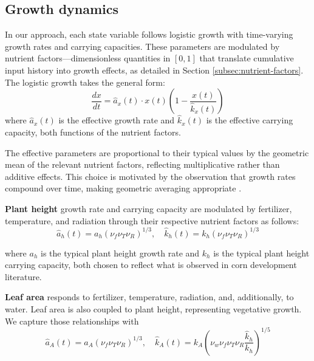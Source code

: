 \documentclass[preprint,12pt]{elsarticle}
\newcommand{\df}[2]{\displaystyle\frac{#1}{#2}}
\begin{document}
\subsection{Growth dynamics}\label{subsec:dynamics}

In our approach, each state variable follows logistic growth with time-varying growth rates and carrying capacities. These parameters are modulated by nutrient factors---dimensionless quantities in $[0,1]$ that translate cumulative input history into growth effects, as detailed in Section \ref{subsec:nutrient-factors}. The logistic growth takes the general form:
\begin{equation}
\df{dx}{dt} = \hat{a}_{x}(t) \cdot x(t) \left( 1 - \df{x(t)}{\hat{k}_{x}(t)} \right)
\label{eqn:logistic-general}
\end{equation}
where $\hat{a}_{x}(t)$ is the effective growth rate and $\hat{k}_{x}(t)$ is the effective carrying capacity, both functions of the nutrient factors.

The effective parameters are proportional to their typical values by the geometric mean of the relevant nutrient factors, reflecting multiplicative rather than additive effects. This choice is motivated by the observation that growth rates compound over time, making geometric averaging appropriate \cite{geometric-mean-growth}.

\textbf{Plant height} growth rate and carrying capacity are modulated by fertilizer, temperature, and radiation     
  through their respective nutrient factors as follows:
\begin{equation}
\hat{a}_{h}(t) = a_{h}(\nu_{f}\nu_{T}\nu_{R})^{1/3}, \quad \hat{k}_{h}(t) = k_{h}(\nu_{f}\nu_{T}\nu_{R})^{1/3}
\label{eqn:hats-for-h}
\end{equation}

\noindent where $a_{h}$ is the typical plant height growth rate and $k_{h}$ is the typical plant height carrying capacity, both chosen to reflect what is observed in corn development literature.

\textbf{Leaf area} responds to fertilizer, temperature, radiation, and, additionally, to water. Leaf area is also coupled to plant height, representing vegetative growth. We capture those relationships with
\begin{equation}
\hat{a}_{A}(t) = a_{A}(\nu_{f}\nu_{T}\nu_{R})^{1/3}, \quad \hat{k}_{A}(t) = k_{A}\left(\nu_{w}\nu_{f}\nu_{T}\nu_{R}\df{\hat{k}_{h}}{k_{h}}\right)^{1/5}
\label{eqn:hats-for-A}
\end{equation}
\end{document}
